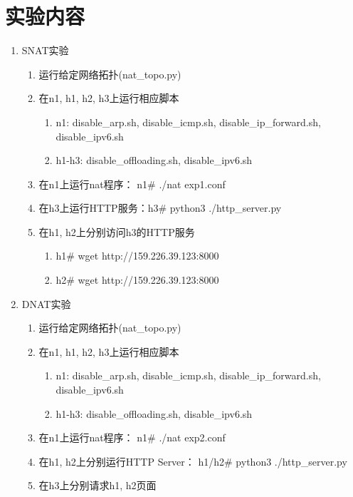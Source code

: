 \documentclass[11pt]{article}
\begin{document}


\section{实验内容}
\begin{enumerate}
	\item SNAT实验
	\begin{enumerate}
        \item 运行给定网络拓扑(nat_topo.py)
        \item 在n1, h1, h2, h3上运行相应脚本
        \begin{enumerate}
            \item n1: disable_arp.sh, disable_icmp.sh, disable_ip_forward.sh, disable_ipv6.sh
            \item h1-h3: disable_offloading.sh, disable_ipv6.sh
        \end{enumerate}
            \item 在n1上运行nat程序：  n1\# ./nat exp1.conf
        \item 在h3上运行HTTP服务：h3\# python3 ./http_server.py
        \item 在h1, h2上分别访问h3的HTTP服务
        \begin{enumerate}
            \item h1\# wget http://159.226.39.123:8000
            \item h2\# wget http://159.226.39.123:8000
        \end{enumerate}
    \end{enumerate}
    \item DNAT实验
    \begin{enumerate}
        \item 运行给定网络拓扑(nat_topo.py)
        \item 在n1, h1, h2, h3上运行相应脚本
        \begin{enumerate}
            \item n1: disable_arp.sh, disable_icmp.sh, disable_ip_forward.sh, disable_ipv6.sh
            \item h1-h3: disable_offloading.sh, disable_ipv6.sh
        \end{enumerate}
        \item 在n1上运行nat程序：  n1\# ./nat exp2.conf
        \item 在h1, h2上分别运行HTTP Server：   h1/h2\# python3 ./http_server.py
        \item 在h3上分别请求h1, h2页面
        \begin{enumerate}

\end{enumerate}
\end{enumerate}
\end{enumerate}
\end{document}
